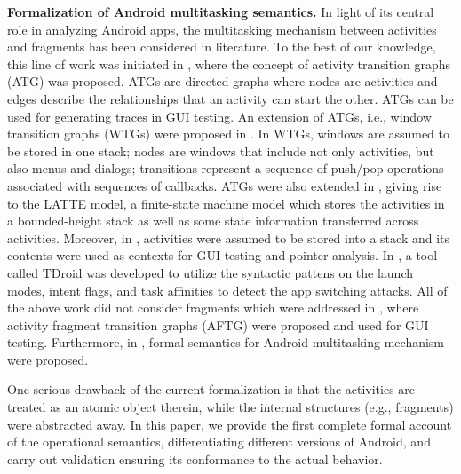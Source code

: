 
\noindent \textbf{Formalization of Android multitasking semantics.}
In light of its central role in  analyzing Android apps, the multitasking mechanism between activities and fragments has been considered in literature. To the best of our knowledge, this line of work was initiated in \cite{AN13}, where the concept of activity transition graphs (ATG) was proposed. ATGs are directed graphs where nodes are activities and edges describe the relationships that an activity can start the other. ATGs can be used for generating traces in GUI testing. An extension of ATGs, i.e., window transition graphs (WTGs) were proposed in \cite{YZWWYR15}. In WTGs, windows are assumed to be stored in one stack; nodes are windows that include not only activities, but also menus and dialogs; transitions represent a sequence of push/pop operations associated with sequences of callbacks. 
ATGs were also extended in \cite{YWYZ17}, giving rise to the LATTE model, a finite-state machine model which stores the activities in a bounded-height stack as well as some state information transferred across activities. Moreover, in \cite{ZSX18}, activities were assumed to be stored into a stack and its contents were used as contexts for GUI testing and pointer analysis. In \cite{LWX18}, a tool called TDroid was developed to utilize the syntactic pattens on the launch modes, intent flags, and task affinities to detect the app switching attacks.
All of the above work did not consider fragments which were addressed in \cite{CHGD18}, where activity fragment transition graphs (AFTG) were proposed and used for GUI testing. %
%
Furthermore, in \cite{LHR17,ChenHSWWY18,HCWWY19}, formal semantics for Android multitasking mechanism were proposed.
%

One serious drawback of the current formalization is that the activities are treated as
an atomic object therein, while the internal structures (e.g.,
fragments) were abstracted away. In this paper, we provide the first complete formal account 
of the operational semantics, differentiating different versions of Android, and carry out validation ensuring its conformance to the actual behavior.  

